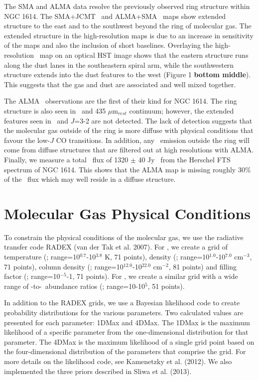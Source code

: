The SMA and ALMA data resolve the previously observed ring structure within NGC 1614. The SMA+JCMT \cotwo\ and ALMA+SMA \cothree\ maps show extended structure to the east and to the southwest beyond the ring of molecular gas. The extended structure in the high-resolution maps is due to an increase in sensitivity of the maps and also the inclusion of short baselines. Overlaying the high-resolution \cothree\ map on an optical HST image shows that the eastern structure runs along the dust lanes in the southeastern spiral arm, while the southwestern structure extends into the dust features to the west (Figure 1 \textbf{bottom middle}). This suggests that the gas and dust are associated and well mixed together.  

The ALMA \cosix\ observations are the first of their kind for NGC 1614. The ring structure is also seen in \cosix\ and 435 $\mu$m$_{rest}$ continuum; however, the extended features seen in \cotwo\ and $J$=3-2 are not detected. The lack of detection suggests that the molecular gas outside of the ring is more diffuse with physical conditions that favour the low-$J$ CO transitions. In addition, any \cosix\ emission outside the ring will come from diffuse structures that are filtered out at high resolutions with ALMA. 
Finally, we measure a total \cosix\ flux of 1320 $\pm$ 40 Jy \kms\ from the Herschel FTS spectrum of NGC 1614. This shows that the ALMA map is missing roughly 30$\%$ of the \cosix\ flux which may well reside in a diffuse structure. 





\section{Molecular Gas Physical Conditions}

To constrain the physical conditions of the molecular gas, we use the radiative transfer code RADEX (van der Tak et al. 2007)\nocite{Vandertak2007}. For \co, we create a grid of temperature (\tkin; range=10$^{0.7}$-10$^{3.8}$ K, 71 points), density (\nhtwo; range=10$^{1.0}$-10$^{7.0}$ cm$^{-3}$, 71 points), column density (\nco; range=10$^{12.0}$-10$^{22.0}$ cm$^{-2}$, 81 points) and filling factor (\ff; range=10$^{-5}$-1, 71 points). For \tco, we create a similar grid with a wide range of  \co-to-\tco\ abundance ratios (\xco; range=10-10$^{5}$, 51 points).

In addition to the RADEX grids, we use a Bayesian likelihood code to create probability distributions for the various parameters. Two calculated values are presented for each parameter: 1DMax and 4DMax. The 1DMax is the maximum likelihood of a specific parameter from the one-dimensional distribution for that parameter. The 4DMax is the maximum likelihood of a single grid point based on the four-dimensional distribution of the parameters that comprise the grid. For more details on the likelihood code, see Kamenetzky et al. (2012)\nocite{Kamenetzky2012}. We also implemented the three priors described in Sliwa et al. (2013)\nocite{Sliwa2013}. 


